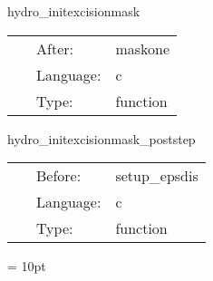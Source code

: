 \vspace{5mm}


\hspace{5mm} hydro\_initexcisionmask 

\hspace{5mm}{\it sets up the excision mask } 


\hspace{5mm}

 \begin{tabular*}{160mm}{cll} 
~ & After:  & maskone \\ 
~ & Language:  & c \\ 
~ & Type:  & function \\ 
\end{tabular*} 


\vspace{5mm}


\hspace{5mm} hydro\_initexcisionmask\_poststep 

\hspace{5mm}{\it sets up the excision mask } 


\hspace{5mm}

 \begin{tabular*}{160mm}{cll} 
~ & Before:  & setup\_epsdis \\ 
~ & Language:  & c \\ 
~ & Type:  & function \\ 
\end{tabular*} 



\vspace{5mm}\parskip = 10pt 
